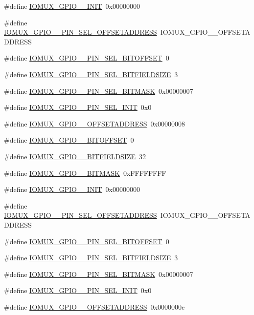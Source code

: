 \begin{DoxyCompactItemize}
\#define \hyperlink{a00560_ae0567cb8ee4328f6f09ccc091a2c6d4b}{IOMUX\_\-GPIO\_\_\-INIT}~0x00000000
\item 
\#define \hyperlink{a00560_aaec1ec34ff921eb817e181478fb86bdd}{IOMUX\_\-GPIO\_\_\-PIN\_\-SEL\_\-OFFSETADDRESS}~IOMUX\_\-GPIO\_\_\-OFFSETADDRESS
\item 
\#define \hyperlink{a00560_a2d9548c4227939aa52b27977cda67a2a}{IOMUX\_\-GPIO\_\_\-PIN\_\-SEL\_\-BITOFFSET}~0
\item 
\#define \hyperlink{a00560_a2ad85748eb4e5122f56c000e8c48ddc7}{IOMUX\_\-GPIO\_\_\-PIN\_\-SEL\_\-BITFIELDSIZE}~3
\item 
\#define \hyperlink{a00560_a11fb00f6bae9af82602fa2628ff587d2}{IOMUX\_\-GPIO\_\_\-PIN\_\-SEL\_\-BITMASK}~0x00000007
\item 
\#define \hyperlink{a00560_a23747ab2b240fdf4a3f23067860dbbd1}{IOMUX\_\-GPIO\_\_\-PIN\_\-SEL\_\-INIT}~0x0
\item 
\#define \hyperlink{a00560_ad95c402a26d2f9e3820d564d5608c067}{IOMUX\_\-GPIO\_\_\-OFFSETADDRESS}~0x00000008
\item 
\#define \hyperlink{a00560_a0a533ca87b5a192d74aef1ba8c7a3e2b}{IOMUX\_\-GPIO\_\_\-BITOFFSET}~0
\item 
\#define \hyperlink{a00560_af7eaf0820b1e629482e01b1aaf8a62cc}{IOMUX\_\-GPIO\_\_\-BITFIELDSIZE}~32
\item 
\#define \hyperlink{a00560_a763ece365fae1f5a4e4130bba9b6b056}{IOMUX\_\-GPIO\_\_\-BITMASK}~0xFFFFFFFF
\item 
\#define \hyperlink{a00560_a66afd5fe8feaa8a4e4d3536b5ddaaf15}{IOMUX\_\-GPIO\_\_\-INIT}~0x00000000
\item 
\#define \hyperlink{a00560_a2a92912622a7c8423d39da448ff749cd}{IOMUX\_\-GPIO\_\_\-PIN\_\-SEL\_\-OFFSETADDRESS}~IOMUX\_\-GPIO\_\_\-OFFSETADDRESS
\item 
\#define \hyperlink{a00560_a841c71939a59fee8970470c7c075c268}{IOMUX\_\-GPIO\_\_\-PIN\_\-SEL\_\-BITOFFSET}~0
\item 
\#define \hyperlink{a00560_af48b27d0e8a713b23a8af1b49ea4fac5}{IOMUX\_\-GPIO\_\_\-PIN\_\-SEL\_\-BITFIELDSIZE}~3
\item 
\#define \hyperlink{a00560_a8d718c53757f4547c884f0f9df6b6b97}{IOMUX\_\-GPIO\_\_\-PIN\_\-SEL\_\-BITMASK}~0x00000007
\item 
\#define \hyperlink{a00560_aa69358d403b200e217adc02ff5be1b87}{IOMUX\_\-GPIO\_\_\-PIN\_\-SEL\_\-INIT}~0x0
\item 
\#define \hyperlink{a00560_a3deee18f2ce8300fa9b96cde9ec5640d}{IOMUX\_\-GPIO\_\_\-OFFSETADDRESS}~0x0000000c

\end{DoxyCompactItemize}
